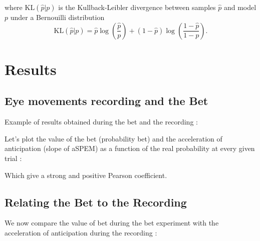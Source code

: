 \documentclass[profile,final,english, draft]{article}%
\newcommand{\KL}[2]{\text{KL}( #1 | #2 )}
\newcommand{\pa}[1]{\left( #1 \right)}
\begin{document}
where $\KL{\hat p}{p}$ is the Kullback-Leibler divergence between samples $\hat p$ and model $p$ under a Bernouilli distribution
\begin{equation}
\KL{\hat p}{p} = \hat{p} \log\pa{\frac{\hat p}{p}} + (1-\hat p) \log\pa{\frac{1-\hat p}{1-p}}.
\end{equation}




\section{Results}


\subsection{Eye movements recording and the Bet}

Example of results obtained during the bet and the recording :




Let's plot the value of the bet (probability bet)  and the acceleration of anticipation (slope of aSPEM) as a function of the real probability at every given trial :
%

Which give a strong and positive Pearson coefficient.

\subsection{Relating the Bet to the Recording}

We now compare the value of bet during the bet experiment with the acceleration of anticipation during the recording :

\end{document}
